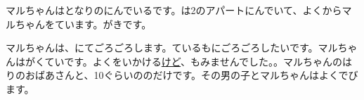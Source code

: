 
\author{Tomislav Mamić}

	
	
	マルちゃんはとなりのにんでいるです。は2のアパートにんでいて、よくからマルちゃんをています。がきです。
	
	マルちゃんは、\hspace{10pt}にてごろごろします。ているもにごろごろしたいです。マルちゃんはがくていです。よくをいかける\underline{けど}、もみませんでした。。マルちゃんのはりのおばあさんと、10ぐらいののだけです。その男の子とマルちゃんはよくでびます。

